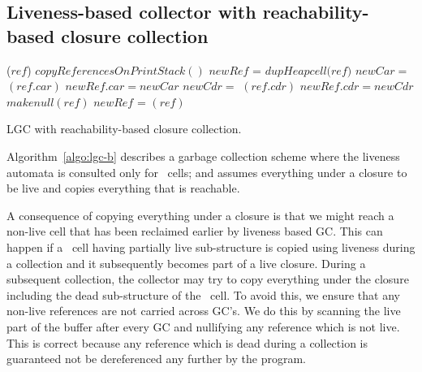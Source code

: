 \documentclass[9pt]{sigplanconf}
\begin{document}
\subsection{Liveness-based collector with reachability-based closure
  collection}
\begin{algorithm}[t]
  \Fn{\Lgc{}}
     {
            {\LCopy($\mathit{ref}$)\;}
            $\mathit{copyReferencesOnPrintStack()}$\;  
     }
        {
              {
                     {
                       $\mathit{newRef}$ =  $\mathit{dupHeapcell(ref})$\; 
                       $\mathit{ newCar}  =$  \LCopy$\mathit{(ref.car)}$\;
                       $\mathit{ newRef.car}   = \mathit{ newCar}$\;
                       $\mathit{ newCdr}  =$  \LCopy$\mathit{(ref.cdr)}$\;
                       $\mathit{ newRef.cdr}   = \mathit{newCdr}$\;
                     }
                     { $\mathit{makenull(ref)}$\;}}
              {
                    { 
                      $\mathit{newRef}$  = \RCopy$(\mathit{ref})$\;
                    }
              }
        }
        \caption{LGC with reachability-based closure collection.\label{algo:lgc-b}}
\end{algorithm}
  Algorithm~\ref{algo:lgc-b}  describes  a garbage  collection  scheme
  where the liveness automata is  consulted only for \CONS\ cells; and
  assumes everything under a closure  to be live and copies everything
  that is reachable.
 
A consequence of  copying everything under a closure is  that we might
reach  a non-live  cell that  has been  reclaimed earlier  by liveness
based GC.   This can  happen if  a \CONS\  cell having  partially live
sub-structure  is copied  using liveness  during a  collection and  it
subsequently  becomes part  of a  live closure.   During a  subsequent
collection, the collector may try to copy everything under the closure
including the dead  sub-structure of the \CONS\ cell.   To avoid this,
we ensure  that any non-live  references are not carried  across GC's.
We do this by scanning the live  part of the buffer after every GC and
nullifying any  reference which is  not live. This is  correct because
any reference which  is dead during a collection is  guaranteed not be
dereferenced any further by the program.
\end{document}
